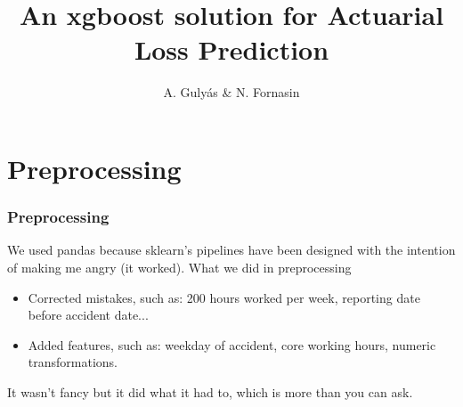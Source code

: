 \documentclass{beamer}
\title{An xgboost solution for Actuarial Loss Prediction} %
\author{A. Guly\'{a}s \& N. Fornasin} %
\institute[ALU] %
{
Team Boosted Goose\\ %
\medskip
}
\date{\quad} %
\begin{document}
\begin{frame}
\titlepage %
\end{frame}






\section{Preprocessing}
\begin{frame}
\frametitle{Preprocessing}
We used pandas because sklearn's pipelines have been designed with the intention of making me angry (it worked). What we did in preprocessing
\begin{itemize}
\item Corrected mistakes, such as: 200 hours worked per week, reporting date before accident date...
\item Added features, such as: weekday of accident, core working hours, numeric transformations.
\end{itemize}
It wasn't fancy but it did what it had to, which is more than you can ask.
\end{frame}
\end{document}
